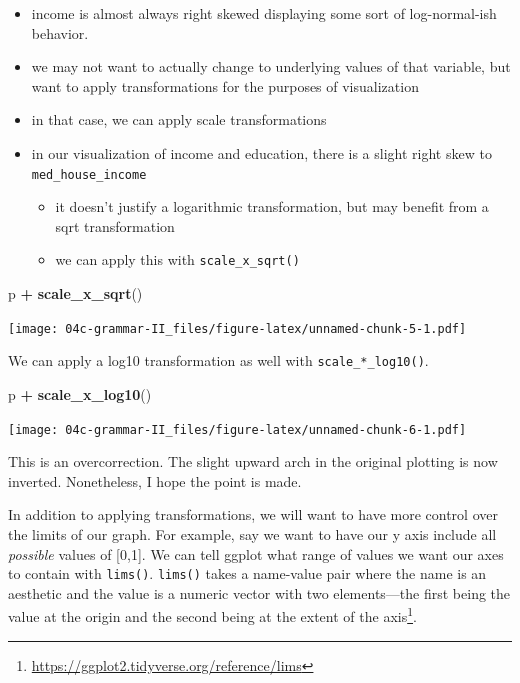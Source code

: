 \documentclass[
]{book}
\newenvironment{Shaded}{\begin{snugshade}}{\end{snugshade}}
\newcommand{\KeywordTok}[1]{\textcolor[rgb]{0.13,0.29,0.53}{\textbf{#1}}}
\newcommand{\NormalTok}[1]{#1}
\newcommand{\OperatorTok}[1]{\textcolor[rgb]{0.81,0.36,0.00}{\textbf{#1}}}
\newcommand{\StringTok}[1]{\textcolor[rgb]{0.31,0.60,0.02}{#1}}
\providecommand{\tightlist}{%
  \setlength{\itemsep}{0pt}\setlength{\parskip}{0pt}}
\begin{document}
\begin{itemize}
\tightlist
\item
  income is almost always right skewed displaying some sort of log-normal-ish behavior.
\item
  we may not want to actually change to underlying values of that variable, but want to apply transformations for the purposes of visualization
\item
  in that case, we can apply scale transformations
\item
  in our visualization of income and education, there is a slight right skew to \texttt{med\_house\_income}

  \begin{itemize}
  \tightlist
  \item
    it doesn't justify a logarithmic transformation, but may benefit from a sqrt transformation
  \item
    we can apply this with \texttt{scale\_x\_sqrt()}
  \end{itemize}
\end{itemize}

\begin{Shaded}
\begin{Highlighting}[]
\NormalTok{p }\OperatorTok{+}
\StringTok{  }\KeywordTok{scale\_x\_sqrt}\NormalTok{() }
\end{Highlighting}
\end{Shaded}

\texttt{[image: 04c-grammar-II\_files/figure-latex/unnamed-chunk-5-1.pdf]}

We can apply a log10 transformation as well with \texttt{scale\_*\_log10()}.

\begin{Shaded}
\begin{Highlighting}[]
\NormalTok{p }\OperatorTok{+}
\StringTok{  }\KeywordTok{scale\_x\_log10}\NormalTok{() }
\end{Highlighting}
\end{Shaded}

\texttt{[image: 04c-grammar-II\_files/figure-latex/unnamed-chunk-6-1.pdf]}

This is an overcorrection. The slight upward arch in the original plotting is now inverted. Nonetheless, I hope the point is made.

In addition to applying transformations, we will want to have more control over the limits of our graph. For example, say we want to have our y axis include all \emph{possible} values of {[}0,1{]}. We can tell ggplot what range of values we want our axes to contain with \texttt{lims()}. \texttt{lims()} takes a name-value pair where the name is an aesthetic and the value is a numeric vector with two elements---the first being the value at the origin and the second being at the extent of the axis\footnote{\url{https://ggplot2.tidyverse.org/reference/lims}}.
\end{document}
